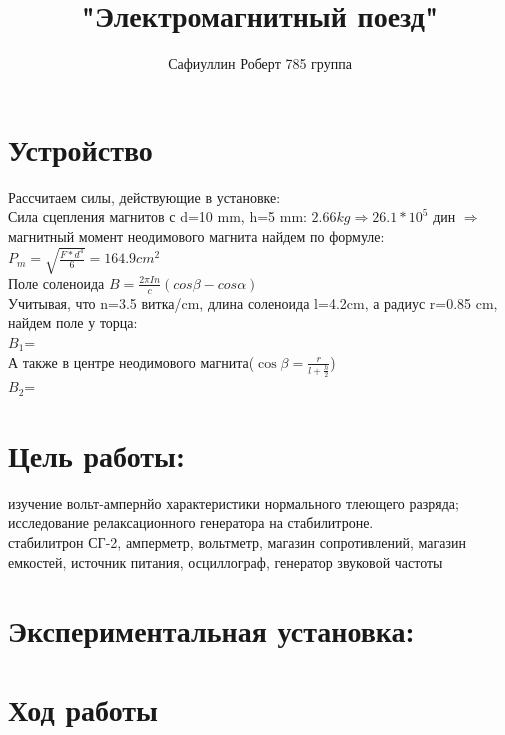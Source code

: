\documentclass[a4paper,12pt]{article} %
\author{Сафиуллин Роберт	785 группа}
\title{"Электромагнитный поезд"}
\begin{document}

\maketitle


\newpage
\section{Устройство}




Рассчитаем силы, действующие в установке: \\
Сила сцепления магнитов с d=10 mm, h=5 mm: $ 2.66 kg\Rightarrow 26.1*10^5$ дин $\Rightarrow$ магнитный момент неодимового магнита найдем по формуле: $P_m= \sqrt{\frac{F*d^4}{6}}=164.9 cm^2$ \\
Поле соленоида $B=\frac{2\pi In}{c} (cos\beta-cos\alpha)$\\
Учитывая, что n=3.5 витка/cm, длина соленоида l=4.2cm, а радиус r=0.85 cm, найдем поле у торца: \\
$B_1$=								\\
А также в центре неодимового магнита($\cos\beta=\frac{r}{l+\frac{h}{2}}$) \\
$B_2$=















\section{Цель работы:}
 изучение вольт-ампернйо характеристики нормального тлеющего разряда; исследование релаксационного генератора на стабилитроне.
\\
стабилитрон СГ-2, амперметр, вольтметр, магазин сопротивлений, магазин емкостей, источник питания, осциллограф, генератор звуковой частоты
 
\section{Экспериментальная установка:}
\begin{center}


\end{center}

\section{Ход работы}
\end{document}
